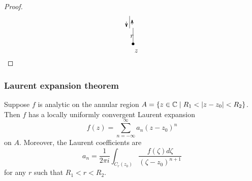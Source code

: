 \documentclass[12pt]{article}
\begin{document}
\begin{proof}
\[\begin{tikzpicture}[x=0.75pt,y=0.75pt,yscale=-.6,xscale=.6]
        \draw    (263.02,62.83) -- (263.02,113.43) ;
        \draw [shift={(263.02,113.43)}, rotate = 90] [color=black  ][fill=black  ][line width=0.75]      (0, 0) circle [x radius= 3.35, y radius= 3.35]   ;
        \draw    (252,25) -- (252,64.26) ;
        \draw    (242,42.64) -- (242,57.64) ;
        \draw [shift={(242,59.64)}, rotate = 270] [color=black  ][line width=0.75]    (10.93,-3.29) .. controls (6.95,-1.4) and (3.31,-0.3) .. (0,0) .. controls (3.31,0.3) and (6.95,1.4) .. (10.93,3.29)   ;
        \draw    (260,52.64) -- (260,39.64) ;
        \draw [shift={(260,37.64)}, rotate = 90] [color=black  ][line width=0.75]    (10.93,-3.29) .. controls (6.95,-1.4) and (3.31,-0.3) .. (0,0) .. controls (3.31,0.3) and (6.95,1.4) .. (10.93,3.29)   ;
        
        \draw (265.21,129.09) node [anchor=north west][inner sep=0.75pt]    {$z$};
        \draw (251.95,82.47) node [anchor=north west][inner sep=0.75pt]    {$r$};
        
        
        \end{tikzpicture}
        \]
\end{proof}

\subsubsection{Laurent expansion theorem}
 Suppose $f$ is analytic on the annular region $A=\{z\in \C\mid R_1<|z-z_0|<R_2\}$. Then $f$ has a locally uniformly convergent Laurent expansion $$
f(z)=\sum_{n=-\infty}^{\infty} a_n\left(z-z_0\right)^n
$$
on $A$. Moreover, the Laurent coefficients are
$$
a_n=\frac{1}{2 \pi i} \int_{C_r\left(z_0\right)} \frac{f(\zeta) d \zeta}{\left(\zeta-z_0\right)^{n+1}}
$$
for any $r$ such that $R_1<r<R_2$.
\end{document}

